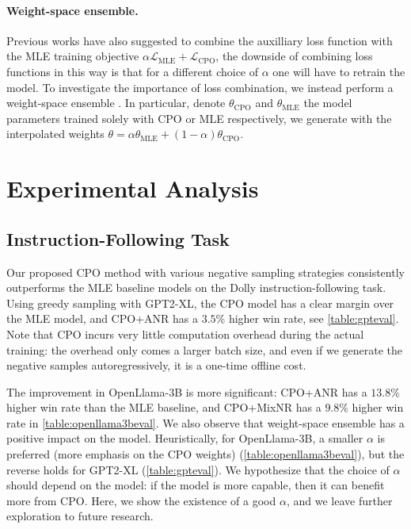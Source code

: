 \paragraph{Weight-space ensemble.} Previous works \citep{liu2022brio} have also suggested to combine the auxilliary loss function with the MLE training objective $\alpha\mathcal{L}_{\mathrm{MLE}}+\mathcal{L}_{\mathrm{CPO}}$, the downside of combining loss functions in this way is that for a different choice of $\alpha$ one will have to retrain the model. To investigate the importance of loss combination, we instead perform a weight-space ensemble \citep{wortsman2022robust}. In particular, denote $\theta_{\mathrm{CPO}}$ and $\theta_{\mathrm{MLE}}$ the model parameters trained solely with CPO or MLE respectively, we generate with the interpolated weights $\theta = \alpha \theta_{\mathrm{MLE}} + (1-\alpha) \theta_{\mathrm{CPO}}$. 


\section{Experimental Analysis}
\subsection{Instruction-Following Task}
Our proposed CPO method with various negative sampling strategies consistently outperforms the MLE baseline models on the Dolly instruction-following task. Using greedy sampling with GPT2-XL, the CPO model has a clear margin over the MLE model, and CPO+ANR has a $3.5\%$ higher win rate, see \cref{table:gpteval}. Note that CPO incurs very little computation overhead during the actual training: the overhead only comes a larger batch size, and even if we generate the negative samples autoregressively, it is a one-time offline cost. 

The improvement in OpenLlama-3B is more significant: CPO+ANR has a $13.8\%$ higher win rate than the MLE baseline, and CPO+MixNR has a $9.8\%$ higher win rate in \cref{table:openllama3beval}. We also observe that weight-space ensemble has a positive impact on the model. Heuristically, for OpenLlama-3B, a smaller $\alpha$ is preferred (more emphasis on the CPO weights) (\cref{table:openllama3beval}), but the reverse holds for GPT2-XL (\cref{table:gpteval}). We hypothesize that the choice of $\alpha$ should depend on the model: if the model is more capable, then it can benefit more from CPO. Here, we show the existence of a good $\alpha$, and we leave further exploration to future research. 
\vspace{-5pt}
